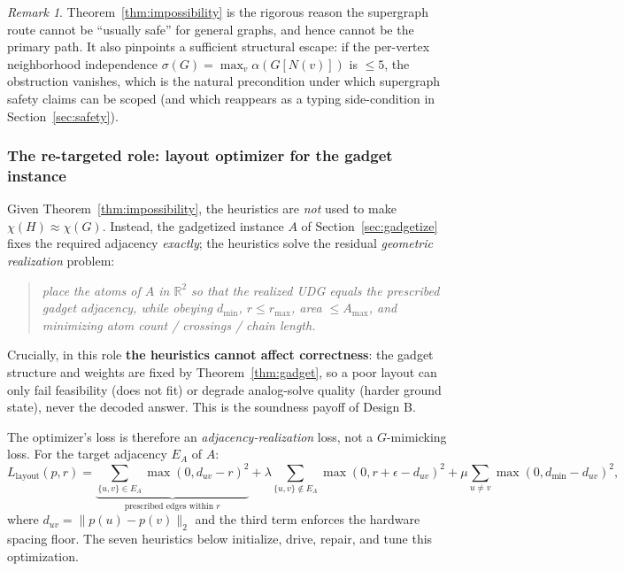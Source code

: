 \documentclass[11pt]{article}
\theoremstyle{definition}
\theoremstyle{remark}
\newtheorem{remark}[theorem]{Remark}
\newcommand{\R}{\mathbb{R}}
\newcommand{\indep}{\alpha}
\begin{document}
\begin{remark}
Theorem~\ref{thm:impossibility} is the rigorous reason the supergraph route cannot be
``usually safe'' for general graphs, and hence cannot be the primary path. It also
pinpoints a sufficient structural escape: if the per-vertex neighborhood independence
$\sigma(G)=\max_v \indep(G[N(v)])$ is $\le 5$, the obstruction vanishes, which is the
natural precondition under which supergraph safety claims can be scoped (and which
reappears as a typing side-condition in Section~\ref{sec:safety}).
\end{remark}

\subsubsection{The re-targeted role: layout optimizer for the gadget instance}
\label{sec:layoutrole}

Given Theorem~\ref{thm:impossibility}, the heuristics are \emph{not} used to make
$\chi(H)\approx\chi(G)$. Instead, the gadgetized instance $A$ of
Section~\ref{sec:gadgetize} fixes the required adjacency \emph{exactly}; the heuristics
solve the residual \emph{geometric realization} problem:

\begin{quote}\itshape
place the atoms of $A$ in $\R^2$ so that the realized UDG equals the prescribed gadget
adjacency, while obeying $d_{\min}$, $r\le r_{\max}$, area $\le A_{\max}$, and minimizing
atom count / crossings / chain length.
\end{quote}

Crucially, in this role \textbf{the heuristics cannot affect correctness}: the gadget
structure and weights are fixed by Theorem~\ref{thm:gadget}, so a poor layout can only
fail feasibility (does not fit) or degrade analog-solve quality (harder ground state),
never the decoded answer. This is the soundness payoff of Design B.

The optimizer's loss is therefore an \emph{adjacency-realization} loss, not a
$G$-mimicking loss. For the target adjacency $E_A$ of $A$:
\begin{equation}
\label{eq:layoutloss}
  L_{\mathrm{layout}}(p,r) =
  \underbrace{\sum_{\{u,v\}\in E_A}\!\!\max(0,d_{uv}-r)^2}_{\text{prescribed edges within }r}
  + \lambda\!\!\sum_{\{u,v\}\notin E_A}\!\!\max(0,r+\epsilon-d_{uv})^2
  + \mu\!\sum_{u\ne v}\max(0,d_{\min}-d_{uv})^2,
\end{equation}
where $d_{uv}=\|p(u)-p(v)\|_2$ and the third term enforces the hardware spacing floor.
The seven heuristics below initialize, drive, repair, and tune this optimization.
\end{document}
